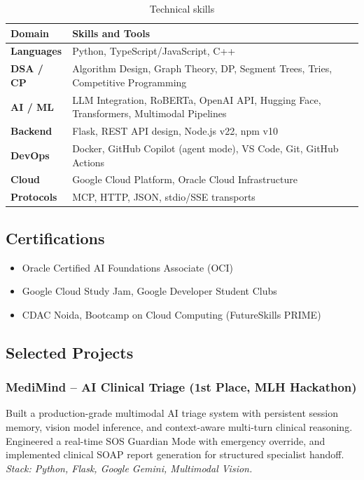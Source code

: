 \documentclass[12pt, a4paper]{article}
\begin{document}
\begin{table}[H]
\centering
{}
\begin{tabularx}{\textwidth}{>{\bfseries\color{mcdark}}l X}
  \toprule
  \rowcolor{mcblue!15}
  \textbf{Domain} & \textbf{Skills and Tools} \\
  \midrule
  Languages & Python, TypeScript/JavaScript, C++ \\
  DSA / CP  & Algorithm Design, Graph Theory, DP,
              Segment Trees, Tries, Competitive Programming \\
  AI / ML   & LLM Integration, RoBERTa, OpenAI API,
              Hugging Face, Transformers, Multimodal Pipelines \\
  Backend   & Flask, REST API design, Node.js v22, npm v10 \\
  DevOps    & Docker, GitHub Copilot (agent mode), VS Code,
              Git, GitHub Actions \\
  Cloud     & Google Cloud Platform, Oracle Cloud Infrastructure \\
  Protocols & MCP, HTTP, JSON, stdio/SSE transports \\
  \bottomrule
\end{tabularx}
\caption{Technical skills}
\end{table}

\subsection{Certifications}

\begin{itemize}[leftmargin=1.5em, itemsep=2pt]
  \item Oracle Certified AI Foundations Associate (OCI)
  \item Google Cloud Study Jam, Google Developer Student Clubs
  \item CDAC Noida, Bootcamp on Cloud Computing (FutureSkills PRIME)
\end{itemize}

\subsection{Selected Projects}

\subsubsection{MediMind -- AI Clinical Triage (1st Place, MLH Hackathon)}

Built a production-grade multimodal AI triage system with persistent
session memory, vision model inference, and context-aware multi-turn
clinical reasoning. Engineered a real-time SOS Guardian Mode with
emergency override, and implemented clinical SOAP report generation for
structured specialist handoff.
\textit{Stack: Python, Flask, Google Gemini, Multimodal Vision.}
\end{document}
